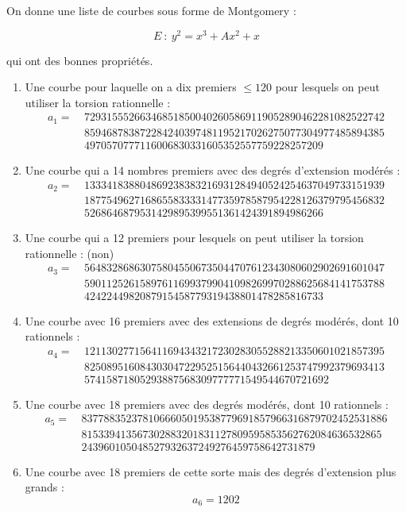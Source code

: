 \documentclass[11pt,a4paper]{article}
\theoremstyle{definition}
\begin{document}
On donne une liste de courbes sous forme de Montgomery :

$$E\ :\ y^2 = x^3 + A x^2 + x$$

qui ont des bonnes propriétés.

\begin{enumerate}
\item Une courbe pour laquelle on a dix premiers $\leq 120$ pour lesquels on peut utiliser la torsion rationnelle :
$$\begin{aligned}
a_1 =\ & 729315552663468518500402605869119052890462281082522742 \\
& 859468783872284240397481195217026275077304977485894385 \\
& 4970570777116006830331605352557759228257209
\end{aligned}$$
\item Une courbe qui a 14 nombres premiers avec des degrés d'extension modérés :
$$\begin{aligned}
a_2 =\ & 133341838804869238383216931284940524254637049733151939 \\
& 187754962716865583333147735978587954228126379795456832 \\
& 5268646879531429895399551361424391894986266
\end{aligned}$$
\item Une courbe qui a 12 premiers pour lesquels on peut utiliser la torsion rationnelle : (non)
$$\begin{aligned}
a_3 =\ & 564832868630758045506735044707612343080602902691601047 \\
& 590112526158976116993799041098269970288625684141753788 \\
& 4242244982087915458779319438801478285816733
\end{aligned}$$
\item Une courbe avec 16 premiers avec des extensions de degrés modérés, dont 10 rationnels :
$$\begin{aligned}
a_4 =\ & 121130277156411694343217230283055288213350601021857395 \\
& 825089516084303047229525156440432661253747992379693413 \\
& 57415871805293887568309777771549544670721692
\end{aligned}$$
\item Une courbe avec 18 premiers avec des degrés modérés, dont 10 rationnels :
$$\begin{aligned}
a_5 =\ & 8377883523781066605019538779691857966316879702452531886 \\
& 815339413567302883201831127809595853562762084636532865 \\
& 243960105048527932637249276459758642731879
\end{aligned}$$
\item Une courbe avec 18 premiers de cette sorte mais des degrés d'extension plus grands :
$$a_6 = 1202$$

\end{enumerate}
\end{document}
